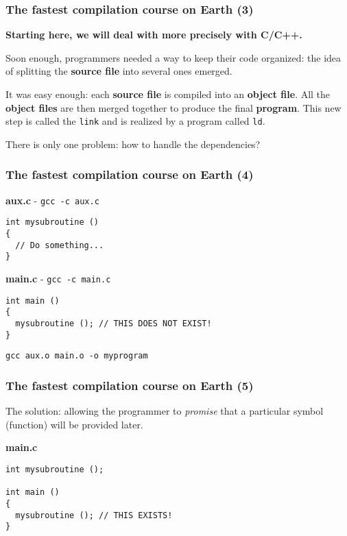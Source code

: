 \documentclass[hyperref={pdfpagelabels=false}]{beamer}
\begin{document}
\begin{frame}[fragile]
\frametitle{The fastest compilation course on Earth (3)}

\textbf{Starting here, we will deal with more precisely with C/C++.}

\vspace{0.3cm}

Soon enough, programmers needed a way to keep their code organized:
the idea of splitting the \textbf{source file} into several ones
emerged.

\vspace{0.3cm}

It was easy enough: each \textbf{source file} is compiled into an
\textbf{object file}. All the \textbf{object files} are then merged
together to produce the final \textbf{program}. This new step is
called the \texttt{link} and is realized by a program called
\texttt{ld}.

\vspace{0.3cm}

There is only one problem: how to handle the dependencies?

\end{frame}

\begin{frame}[fragile]
\frametitle{The fastest compilation course on Earth (4)}

\textbf{aux.c} - \texttt{gcc -c aux.c}
\begin{verbatim}
int mysubroutine ()
{
  // Do something...
}
\end{verbatim}

\textbf{main.c} - \texttt{gcc -c main.c}
\begin{verbatim}
int main ()
{
  mysubroutine (); // THIS DOES NOT EXIST!
}
\end{verbatim}


\texttt{gcc aux.o main.o -o myprogram}

\end{frame}


\begin{frame}[fragile]
\frametitle{The fastest compilation course on Earth (5)}

The solution: allowing the programmer to \textit{promise} that a
particular symbol (function) will be provided later.

\textbf{main.c}
\begin{verbatim}
int mysubroutine ();

int main ()
{
  mysubroutine (); // THIS EXISTS!
}
\end{verbatim}

\end{frame}
\end{document}
